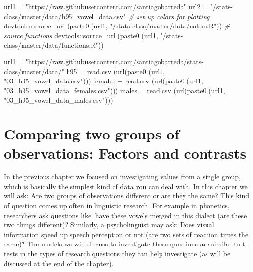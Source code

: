 \documentclass[
]{book}
\newenvironment{Shaded}{\begin{snugshade}}{\end{snugshade}}
\newcommand{\CommentTok}[1]{\textcolor[rgb]{0.56,0.35,0.01}{\textit{#1}}}
\newcommand{\FunctionTok}[1]{\textcolor[rgb]{0.00,0.00,0.00}{#1}}
\newcommand{\NormalTok}[1]{#1}
\newcommand{\OtherTok}[1]{\textcolor[rgb]{0.56,0.35,0.01}{#1}}
\newcommand{\SpecialCharTok}[1]{\textcolor[rgb]{0.00,0.00,0.00}{#1}}
\newcommand{\StringTok}[1]{\textcolor[rgb]{0.31,0.60,0.02}{#1}}
\begin{document}
\begin{Shaded}
\begin{Highlighting}[]
\NormalTok{url1 }\OtherTok{=} \StringTok{"https://raw.githubusercontent.com/santiagobarreda"}
\NormalTok{url2 }\OtherTok{=} \StringTok{"/stats{-}class/master/data/h95\_vowel\_data.csv"}
\CommentTok{\# set up colors for plotting}
\NormalTok{devtools}\SpecialCharTok{::}\FunctionTok{source\_url}\NormalTok{ (}\FunctionTok{paste0}\NormalTok{ (url1, }\StringTok{"/stats{-}class/master/data/colors.R"}\NormalTok{))}
\CommentTok{\# source functions}
\NormalTok{devtools}\SpecialCharTok{::}\FunctionTok{source\_url}\NormalTok{ (}\FunctionTok{paste0}\NormalTok{ (url1, }\StringTok{"/stats{-}class/master/data/functions.R"}\NormalTok{))}

\NormalTok{url1 }\OtherTok{=} \StringTok{"https://raw.githubusercontent.com/santiagobarreda/stats{-}class/master/data/"}
\NormalTok{h95 }\OtherTok{=} \FunctionTok{read.csv}\NormalTok{ (}\FunctionTok{url}\NormalTok{(}\FunctionTok{paste0}\NormalTok{ (url1, }\StringTok{"03\_h95\_vowel\_data.csv"}\NormalTok{)))}
\NormalTok{females }\OtherTok{=} \FunctionTok{read.csv}\NormalTok{ (}\FunctionTok{url}\NormalTok{(}\FunctionTok{paste0}\NormalTok{ (url1, }\StringTok{"03\_h95\_vowel\_data\_females.csv"}\NormalTok{)))}
\NormalTok{males }\OtherTok{=} \FunctionTok{read.csv}\NormalTok{ (}\FunctionTok{url}\NormalTok{(}\FunctionTok{paste0}\NormalTok{ (url1, }\StringTok{"03\_h95\_vowel\_data\_males.csv"}\NormalTok{)))}
\end{Highlighting}
\end{Shaded}

\hypertarget{comparing-two-groups-of-observations-factors-and-contrasts}{%
\chapter{Comparing two groups of observations: Factors and contrasts}\label{comparing-two-groups-of-observations-factors-and-contrasts}}

In the previous chapter we focused on investigating values from a single group, which is basically the simplest kind of data you can deal with. In this chapter we will ask: Are two groups of observations different or are they the same? This kind of question comes up often in linguistic research. For example in phonetics, researchers ask questions like, have these vowels merged in this dialect (are these two things different)? Similarly, a psycholinguist may ask: Does visual information speed up speech perception or not (are two sets of reaction times the same)? The models we will discuss to investigate these questions are similar to t-tests in the types of research questions they can help investigate (as will be discussed at the end of the chapter).
\end{document}
